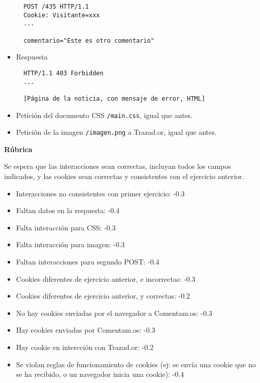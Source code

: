 \begin{itemize}
\begin{verbatim}
  POST /435 HTTP/1.1
  Cookie: Visitante=xxx
  ...

  comentario="Este es otro comentario"
\end{verbatim}

\item Respuesta

\begin{verbatim}
  HTTP/1.1 403 Forbidden
  ...

  [Página de la noticia, con mensaje de error, HTML]
\end{verbatim}

\item Petición del documento CSS \texttt{/main.css}, igual que antes.

\item Petición de la imagen \texttt{/imagen.png} a Trazad.or, igual que antes.
\end{itemize}

\vspace{.4cm}\textbf{Rúbrica}

Se espera que las interacciones sean correctas, incluyan todos los campos indicados, y las cookies sean correctas y consistentes con el ejercicio anterior.

\begin{itemize}
\item Interacciones no consistentes con primer ejercicio: -0.3
\item Faltan datos en la respuesta: -0.4
\item Falta interacción para CSS: -0.3
\item Falta interacción para imagen: -0.3
\item Faltan interacciones para segundo POST: -0.4
\item Cookies diferentes de ejercicio anterior, e incorrectas: -0.3
\item Cookies diferentes de ejercicio anterior, y correctas: -0.2
\item No hay cookies enviadas por el navegador a Comentam.os: -0.3
\item Hay cookies enviadas por Comentam.os: -0.3
\item Hay cookie en intercción con Trazad.or: -0.2
\item Se violan reglas de funcionamiento de cookies (ej: se envía una cookie que no se ha recibido, o un navegador inicia una cookie): -0.4
\end{itemize}


